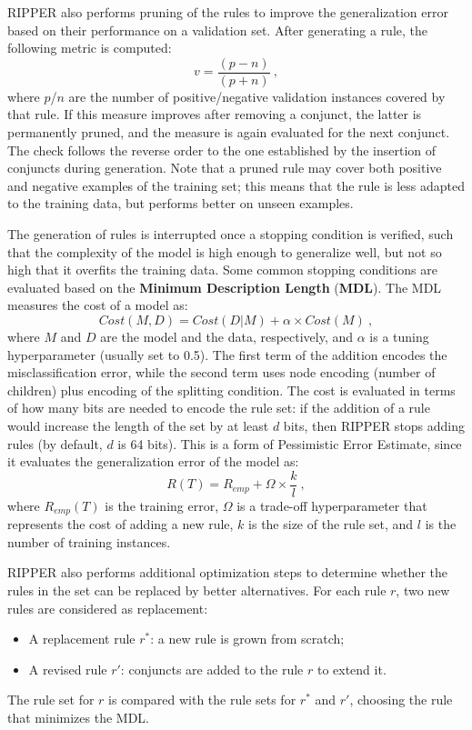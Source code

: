 RIPPER also performs pruning of the rules to improve the generalization error based on their performance on a validation set. After generating a rule, the following metric is computed:
\begin{equation*}
    v = \dfrac{(p-n)}{(p+n)} \ ,
\end{equation*}
where $p$/$n$ are the number of positive/negative validation instances covered by that rule. If this measure improves after removing a conjunct, the latter is permanently pruned, and the measure is again evaluated for the next conjunct. The check follows the reverse order to the one established by the insertion of conjuncts during generation. Note that a pruned rule may cover both positive and negative examples of the training set; this means that the rule is less adapted to the training data, but performs better on unseen examples. 

The generation of rules is interrupted once a stopping condition is verified, such that the complexity of the model is high enough to generalize well, but not so high that it overfits the training data. Some common stopping conditions are evaluated based on the \textbf{Minimum Description Length} (\textbf{MDL}). The MDL measures the cost of a model as:
\begin{equation*}
    Cost(M, D) = Cost(D|M) + \alpha \times Cost(M) \ ,
\end{equation*}
where $M$ and $D$ are the model and the data, respectively, and $\alpha$ is a tuning hyperparameter (usually set to 0.5).  The first term of the addition encodes the misclassification error, while the second term uses node encoding (number of children) plus encoding of the splitting condition. The cost is evaluated in terms of how many bits are needed to encode the rule set: if the addition of a rule would increase the length of the set by at least $d$ bits, then RIPPER stops adding rules (by default, $d$ is 64 bits). This is a form of Pessimistic Error Estimate, since it evaluates the generalization error of the model as:
\begin{equation*}
    R(T) = R_{emp} + \Omega \times \dfrac{k}{l} \ ,
\end{equation*}
where $R_{emp}(T)$ is the training error, $\Omega$ is a trade-off hyperparameter that represents the cost of adding a new rule, $k$ is the size of the rule set, and $l$ is the number of training instances.

RIPPER also performs additional optimization steps to determine whether the rules in the set can be replaced by better alternatives. For each rule $r$, two new rules are considered as replacement:
\begin{itemize}
    \item A replacement rule $r^*$: a new rule is grown from scratch;
    \item A revised rule $r'$: conjuncts are added to the rule $r$ to extend it.
\end{itemize}
The rule set for $r$ is compared with the rule sets for $r^*$ and $r'$, choosing the rule that minimizes the MDL.

